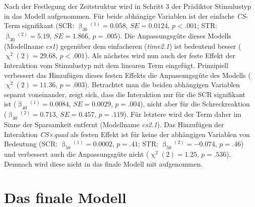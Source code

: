 			Nach der Festlegung der Zeitstruktur wird in Schritt 3 der Prädiktor Stimulustyp in das Modell aufgenommen. 
			Für beide abhängige Variablen ist der einfache \textit{CS}-Term signifikant (SCR: $\upbeta_{30}{}^{(1)}=0.058$, $SE=0.0124$, $p<.001$; 
			STR: $\upbeta_{30}{}^{(2)}=	5.19$, $SE=1.866$, $p=.005$). 
			Die Anpassungsgüte dieses Modells (Modellname \textit{cs1}) gegenüber dem einfacheren (\textit{time2.1}) ist bedeutend besser ($\upchi^2(2)=29.68$, $p<.001$). 
			Als nächstes wird nun auch der feste Effekt der Interaktion vom Stimulustyp mit dem linearen Term eingefügt. Prinzipiell verbessert das Hinzufügen dieses festen Effekts die Anpassungsgüte des Modells ($\upchi^2(2)=11.36$, $p=.003$). Betrachtet man die beiden abhängigen Variablen separat voneinander, zeigt sich, dass die Interaktion nur für die SCR signifikant ist ($\upbeta_{40}{}^{(1)}=0.0084$, $SE=0.0029$, $p=.004$), nicht aber für die Schreckreaktion ($\upbeta_{40}{}^{(2)}=0.713$, $SE=0.457$, $p=.119$). Für letztere wird der Term daher im Sinne der Sparsamkeit entfernt (Modellname \textit{cs2.1}). 
			Das Hinzufügen der Interaktion \textit{CS$\times$quad} als festen Effekt ist für keine der abhängigen Variablen von Bedeutung (SCR: $\upbeta_{50}{}^{(1)}=0.0002$, $p=.41$; STR: $\upbeta_{50}{}^{(2)}=-0.074$, $p=.46$) und verbessert auch die Anpassungsgüte nicht ($\upchi^2(2)=1.25$, $p=.536$). Demnach wird diese nicht in das finale Modell mit aufgenommen.
		
				
	\section{Das finale Modell}		\label{finalmodel}
		
